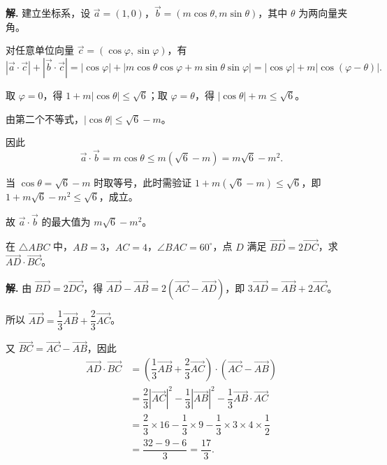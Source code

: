 \documentclass[11pt]{ctexrep}
\begin{document}
\textbf{解.} 建立坐标系，设 $\overrightarrow{a} = (1, 0)$，$\overrightarrow{b} = (m\cos\theta, m\sin\theta)$，其中 $\theta$ 为两向量夹角。

对任意单位向量 $\overrightarrow{c} = (\cos\varphi, \sin\varphi)$，有
\[
    |\overrightarrow{a} \cdot \overrightarrow{c}| + |\overrightarrow{b} \cdot \overrightarrow{c}| = |\cos\varphi| + |m\cos\theta\cos\varphi + m\sin\theta\sin\varphi| = |\cos\varphi| + m|\cos(\varphi-\theta)|.
\]

取 $\varphi = 0$，得 $1 + m|\cos\theta| \leq \sqrt{6}$；取 $\varphi = \theta$，得 $|\cos\theta| + m \leq \sqrt{6}$。

由第二个不等式，$|\cos\theta| \leq \sqrt{6} - m$。

因此
\[
    \overrightarrow{a} \cdot \overrightarrow{b} = m\cos\theta \leq m(\sqrt{6}-m) = m\sqrt{6} - m^2.
\]

当 $\cos\theta = \sqrt{6}-m$ 时取等号，此时需验证 $1 + m(\sqrt{6}-m) \leq \sqrt{6}$，即 $1 + m\sqrt{6} - m^2 \leq \sqrt{6}$，成立。

故 $\overrightarrow{a} \cdot \overrightarrow{b}$ 的最大值为 $m\sqrt{6} - m^2$。

\begin{example}[练习]
    在 $\triangle ABC$ 中，$AB = 3$，$AC = 4$，$\angle BAC = 60^{\circ}$，点 $D$ 满足 $\overrightarrow{BD} = 2\overrightarrow{DC}$，求 $\overrightarrow{AD} \cdot \overrightarrow{BC}$。
\end{example}

\textbf{解.} 由 $\overrightarrow{BD} = 2\overrightarrow{DC}$，得 $\overrightarrow{AD} - \overrightarrow{AB} = 2(\overrightarrow{AC} - \overrightarrow{AD})$，即 $3\overrightarrow{AD} = \overrightarrow{AB} + 2\overrightarrow{AC}$。

所以 $\overrightarrow{AD} = \dfrac{1}{3}\overrightarrow{AB} + \dfrac{2}{3}\overrightarrow{AC}$。

又 $\overrightarrow{BC} = \overrightarrow{AC} - \overrightarrow{AB}$，因此
\begin{align*}
    \overrightarrow{AD} \cdot \overrightarrow{BC} &= \left(\dfrac{1}{3}\overrightarrow{AB} + \dfrac{2}{3}\overrightarrow{AC}\right) \cdot (\overrightarrow{AC} - \overrightarrow{AB}) \\
    &= \dfrac{2}{3}|\overrightarrow{AC}|^2 - \dfrac{1}{3}|\overrightarrow{AB}|^2 - \dfrac{1}{3}\overrightarrow{AB} \cdot \overrightarrow{AC} \\
    &= \dfrac{2}{3} \times 16 - \dfrac{1}{3} \times 9 - \dfrac{1}{3} \times 3 \times 4 \times \dfrac{1}{2} \\
    &= \dfrac{32-9-6}{3} = \dfrac{17}{3}.
\end{align*}
\end{document}
